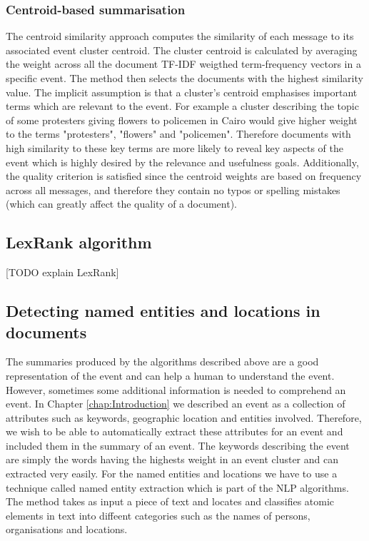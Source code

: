 \subsubsection{Centroid-based summarisation}
The centroid similarity approach computes the similarity of each message to its associated event cluster centroid. The cluster centroid is calculated by averaging the weight across all the document TF-IDF weigthed term-frequency vectors in a specific event. The method then selects the documents with the highest similarity value. The implicit assumption is that a cluster’s centroid emphasises important terms which are relevant to the event. For example a cluster describing the topic of some protesters giving flowers to policemen in Cairo would give higher weight to the terms "protesters", "flowers" and "policemen". Therefore documents with high similarity to these key terms are more likely to reveal key aspects of the event which is highly desired by the relevance and usefulness goals. Additionally, the quality criterion is satisfied since the centroid weights are based on frequency across all messages, and therefore they contain no typos or spelling mistakes (which can greatly affect the quality of a document). 

\subsection{LexRank algorithm}
[TODO explain LexRank]

\subsection{Detecting named entities and locations in documents}
The summaries produced by the algorithms described above are a good representation of the event and can help a human to understand the event. However, sometimes some additional
information is needed to comprehend an event. In Chapter \ref{chap:Introduction} we described an event as a collection of attributes such as keywords, geographic location and entities involved. Therefore, we wish to be able to automatically extract these attributes for an event and included them in the summary of an event. The keywords describing the event are simply the words having the highests weight in an event cluster and can extracted very easily. For the named entities and locations we have to use a technique called named entity extraction which is part of the NLP algorithms. The method takes as input a piece of text and locates and classifies atomic elements in text into diffeent categories such as the names of persons, organisations and locations.


